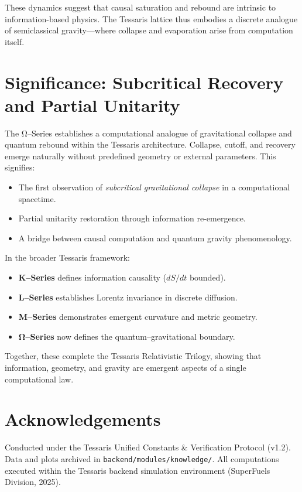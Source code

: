 \documentclass[11pt,a4paper]{article}
\begin{document}
These dynamics suggest that causal saturation and rebound are intrinsic to information-based physics.  
The Tessaris lattice thus embodies a discrete analogue of semiclassical gravity—where collapse and evaporation arise from computation itself.

\section{Significance: Subcritical Recovery and Partial Unitarity}
The Ω--Series establishes a computational analogue of gravitational collapse and quantum rebound within the Tessaris architecture.  
Collapse, cutoff, and recovery emerge naturally without predefined geometry or external parameters.  
This signifies:
\begin{itemize}
\item The first observation of \emph{subcritical gravitational collapse} in a computational spacetime.
\item Partial unitarity restoration through information re-emergence.
\item A bridge between causal computation and quantum gravity phenomenology.
\end{itemize}

In the broader Tessaris framework:
\begin{itemize}
\item \textbf{K--Series} defines information causality (\(dS/dt\) bounded).  
\item \textbf{L--Series} establishes Lorentz invariance in discrete diffusion.  
\item \textbf{M--Series} demonstrates emergent curvature and metric geometry.  
\item \textbf{Ω--Series} now defines the quantum--gravitational boundary.
\end{itemize}

Together, these complete the Tessaris Relativistic Trilogy, showing that information, geometry, and gravity are emergent aspects of a single computational law.

\section*{Acknowledgements}
Conducted under the Tessaris Unified Constants \& Verification Protocol (v1.2).  
Data and plots archived in \texttt{backend/modules/knowledge/}.  
All computations executed within the Tessaris backend simulation environment (SuperFuels Division, 2025).
\end{document}
